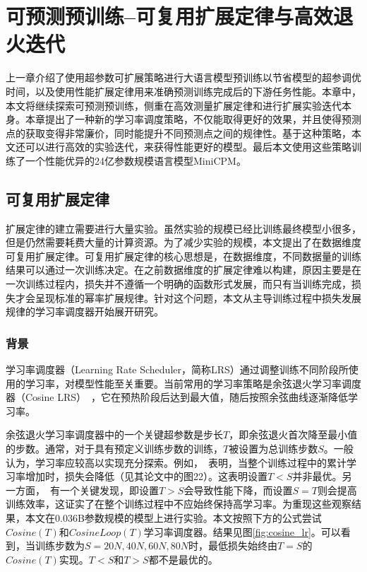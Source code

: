 
\chapter{可预测预训练--可复用扩展定律与高效退火迭代}

上一章介绍了使用超参数可扩展策略进行大语言模型预训练以节省模型的超参调优时间，以及使用性能扩展定律用来准确预测训练完成后的下游任务性能。本章中，本文将继续探索可预测预训练，侧重在高效测量扩展定律和进行扩展实验迭代本身。本章提出了一种新的学习率调度策略，不仅能取得更好的效果，并且使得预测点的获取变得非常廉价，同时能提升不同预测点之间的规律性。基于这种策略，本文还可以进行高效的实验迭代，来获得性能更好的模型。最后本文使用这些策略训练了一个性能优异的24亿参数规模语言模型MiniCPM。


\section{可复用扩展定律}
扩展定律的建立需要进行大量实验。虽然实验的规模已经比训练最终模型小很多，但是仍然需要耗费大量的计算资源。为了减少实验的规模，本文提出了在数据维度可复用扩展定律。可复用扩展定律的核心思想是，在数据维度，不同数据量的训练结果可以通过一次训练决定。在之前数据维度的扩展定律难以构建，原因主要是在一次训练过程内，损失并不遵循一个明确的函数形式发展，而只有当训练完成，损失才会呈现标准的幂率扩展规律。针对这个问题，本文从主导训练过程中损失发展规律的学习率调度器开始展开研究。

\subsection{背景}
学习率调度器（Learning Rate Scheduler，简称LRS）通过调整训练不同阶段所使用的学习率，对模型性能至关重要。当前常用的学习率策略是余弦退火学习率调度器（Cosine LRS）~\citep{kaplan2020scaling, hoffmann2022training, rae2021scaling, touvron2023llama, bai2023qwen, almazrouei2023falcon}，它在预热阶段后达到最大值，随后按照余弦曲线逐渐降低学习率。

余弦退火学习率调度器中的一个关键超参数是步长$T$，即余弦退火首次降至最小值的步数。通常，对于具有预定义训练步数的训练，$T$被设置为总训练步数$S$。一般认为，学习率应较高以实现充分探索。例如，~\citet{kaplan2020scaling}表明，当整个训练过程中的累计学习率增加时，损失会降低（见其论文中的图22）。这表明设置$T < S$并非最优。另一方面，~\citet{hoffmann2022training}有一个关键发现，即设置$T > S$会导致性能下降，而设置$S = T$则会提高训练效率，这证实了在整个训练过程中不应始终保持高学习率。为重现这些观察结果，本文在0.036B参数规模的模型上进行实验。本文按照下方的公式尝试$Cosine(T)$和$CosineLoop(T)$学习率调度器。结果见图\ref{fig:cosine_lr}。可以看到，当训练步数为$S = 20N, 40N, 60N, 80N$时，最低损失始终由$T = S$的$Cosine(T)$实现。$T < S$和$T > S$都不是最优的。

